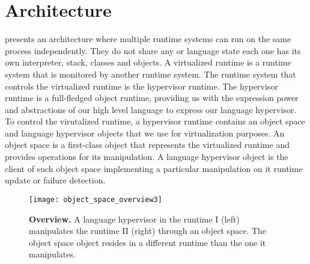 



\section{\Vtt Architecture} \label{sec:virtualization_overview}

\Vtt presents an architecture where multiple runtime systems can run on the same process independently. They do not share any \VM or language state \ie each one has its own interpreter, stack, classes and objects. A virtualized runtime is a runtime system that is monitored by another runtime system. The runtime system that controls the virtualized runtime is the hypervisor runtime. The hypervisor runtime is a full-fledged object runtime, providing us with the expression power and abstractions of our high level language to express our language hypervisor. To control the virutalized runtime, a hypervisor runtime contains an object space and language hypervisor objects that we use for virtualization purposes. An object space is a first-class object that represents the virtualized runtime and provides operations for its manipulation. A language hypervisor object is the client of such object space implementing a particular manipulation on it \eg runtime update or failure detection.

\begin{figure}[htb]
\begin{center}
\texttt{[image: object\_space\_overview3]}
\caption{\textbf{\VTT Overview.} A language hypervisor in the runtime I (left) manipulates the runtime II (right) through an object space. The object space object resides in a different runtime than the one it manipulates.\label{fig:objectSpaceOverview}}
\end{center}
\end{figure}

